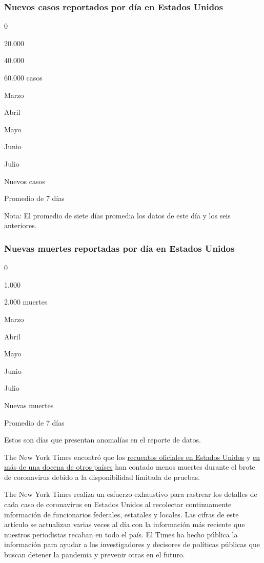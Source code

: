 \hypertarget{nuevos-casos-reportados-por-duxeda-en-estados-unidos}{%
\subsubsection{Nuevos casos reportados por día en Estados
Unidos}\label{nuevos-casos-reportados-por-duxeda-en-estados-unidos}}

0

20.000

40.000

60.000 casos

Marzo

Abril

Mayo

Junio

Julio

Nuevos casos

Promedio de 7 días

Nota: El promedio de siete días promedia los datos de este día y los
seis anteriores.

\hypertarget{nuevas-muertes-reportadas-por-duxeda-en-estados-unidos}{%
\subsubsection{Nuevas muertes reportadas por día en Estados
Unidos}\label{nuevas-muertes-reportadas-por-duxeda-en-estados-unidos}}

0

1.000

2.000 muertes

Marzo

Abril

Mayo

Junio

Julio

Nuevas muertes

Promedio de 7 días

Estos son días que presentan anomalías en el reporte de datos.

The New York Times encontró que los
\href{https://www.nytimes.com/interactive/2020/04/28/us/coronavirus-death-toll-total.html}{recuentos
oficiales en Estados Unidos} y
\href{https://www.nytimes.com/interactive/2020/04/21/world/coronavirus-missing-deaths.html}{en
más de una docena de otros países} han contado menos muertes durante el
brote de coronavirus debido a la disponibilidad limitada de pruebas.

The New York Times realiza un esfuerzo exhaustivo para rastrear los
detalles de cada caso de coronavirus en Estados Unidos al recolectar
continuamente información de funcionarios federales, estatales y
locales. Las cifras de este artículo se actualizan varias veces al día
con la información más reciente que nuestros periodistas recaban en todo
el país. El Times ha hecho pública la información para ayudar a los
investigadores y decisores de políticas públicas que buscan detener la
pandemia y prevenir otras en el futuro.

